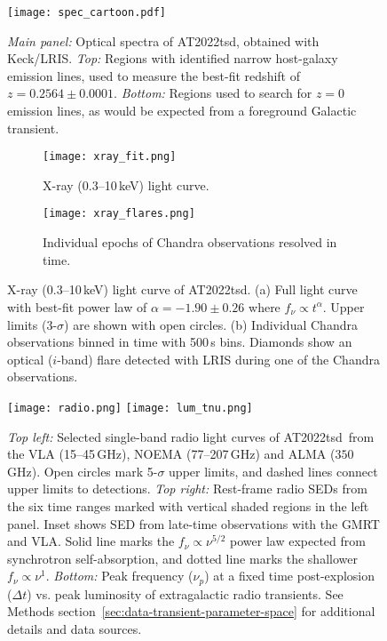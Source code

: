 \documentclass{nature_plusfigure}
\newcommand{\at}{AT2022tsd}
\begin{document}
\begin{extended_data}

\renewcommand{\thefigure}{\arabic{figure}~Extended~Data}
\renewcommand{\thefigure}{Extended Data Figure \arabic{figure}}
\renewcommand{\figurename}{}
\setcounter{figure}{0}

\renewcommand{\thetable}{\arabic{table}~Extended~Data}
\renewcommand{\thetable}{Extended Data Table \arabic{table}}
\renewcommand{\tablename}{}
\setcounter{table}{0}

\begin{figure}[ht]
 \centering
\texttt{[image: spec\_cartoon.pdf]}
  \caption{\emph{Main panel:} Optical spectra of \at, obtained with Keck/LRIS. \emph{Top:} Regions with identified narrow host-galaxy emission lines, used to measure the best-fit redshift of $z=0.2564\pm0.0001$. \emph{Bottom:} Regions used to search for $z=0$ emission lines, as would be expected from a foreground Galactic transient.}
 \label{fig:spec}
\end{figure}

\begin{figure}[!ht]
 \centering
 \begin{subfigure}[t]{1.0\textwidth}
 	\centering
	\texttt{[image: xray\_fit.png]}
	\caption{X-ray (0.3--10\,keV) light curve.}
 \end{subfigure}
 \begin{subfigure}[t]{1.0\textwidth}
 	\centering
	\texttt{[image: xray\_flares.png]}
	\caption{Individual epochs of Chandra observations resolved in time.}
 \end{subfigure}
  \caption{X-ray (0.3--10\,keV) light curve of \at. (a) Full light curve with best-fit power law of $\alpha=-1.90\pm0.26$ where $f_\nu \propto t^{\alpha}$. Upper limits (3-$\sigma$) are shown with open circles. (b) Individual Chandra observations binned in time with 500\,s bins. Diamonds show an optical ($i$-band) flare detected with LRIS during one of the Chandra observations.}
 \label{fig:xray-lc}
\end{figure}

\begin{figure}[!ht]
 \centering
\texttt{[image: radio.png]}
\texttt{[image: lum\_tnu.png]}
  \caption{\emph{Top left:} Selected single-band radio light curves of \at\ from the VLA (15--45\,GHz), NOEMA (77--207\,GHz) and ALMA ($350$\,GHz). Open circles mark 5-$\sigma$ upper limits, and dashed lines connect upper limits to detections. \emph{Top right:} Rest-frame radio SEDs from the six time ranges marked with vertical shaded regions in the left panel. Inset shows SED from late-time observations with the GMRT and VLA. Solid line marks the $f_\nu \propto \nu^{5/2}$ power law expected from synchrotron self-absorption, and dotted line marks the shallower $f_\nu \propto \nu^{1}$. \emph{Bottom:} Peak frequency ($\nu_p$) at a fixed time post-explosion ($\Delta t$) vs. peak luminosity of extragalactic radio transients. See Methods section~\ref{sec:data-transient-parameter-space} for additional details and data sources.}
 \label{fig:radio}
\end{figure}


\end{extended_data}
\end{document}
